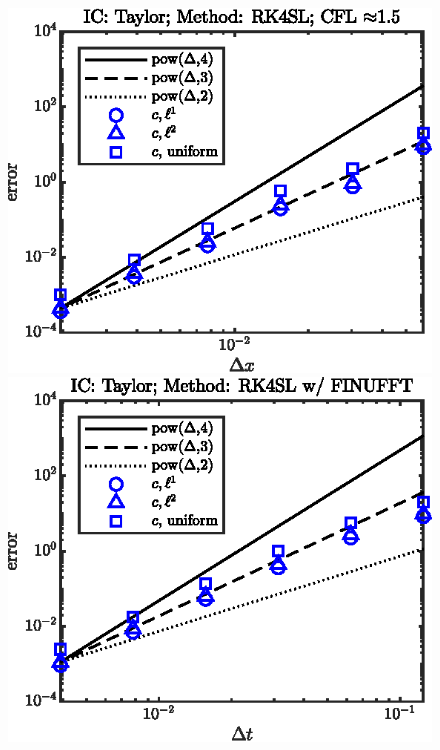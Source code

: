 \documentclass[11pt,letterpaper]{article}
\begin{document}
\begin{figure}[H]
    \centering
    \includegraphics{figs/nonlin_conv_order_Taylor_RK4SL}
    \includegraphics{figs/nonlin_conv_order_Taylor_finu_RK4SL}

\end{figure}
\end{document}
